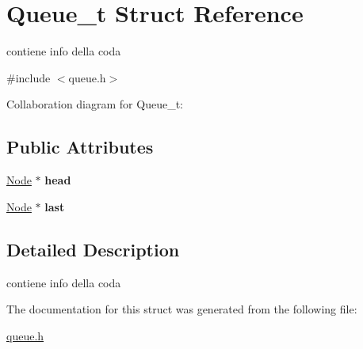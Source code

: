 \hypertarget{structQueue__t}{}\section{Queue\+\_\+t Struct Reference}
\label{structQueue__t}


contiene info della coda  




{\ttfamily \#include $<$queue.\+h$>$}



Collaboration diagram for Queue\+\_\+t\+:
\subsection*{Public Attributes}
\begin{DoxyCompactItemize}
\item 
\hyperlink{structNode}{Node} $\ast$ {\bfseries head}\hypertarget{structQueue__t_abad0ce2960ed53252482bf451e9d37fe}{}\label{structQueue__t_abad0ce2960ed53252482bf451e9d37fe}

\item 
\hyperlink{structNode}{Node} $\ast$ {\bfseries last}\hypertarget{structQueue__t_a9e83427b24662b44e3f9af5e99f22306}{}\label{structQueue__t_a9e83427b24662b44e3f9af5e99f22306}

\end{DoxyCompactItemize}


\subsection{Detailed Description}
contiene info della coda 

The documentation for this struct was generated from the following file\+:\begin{DoxyCompactItemize}
\item 
\hyperlink{queue_8h}{queue.\+h}\end{DoxyCompactItemize}
